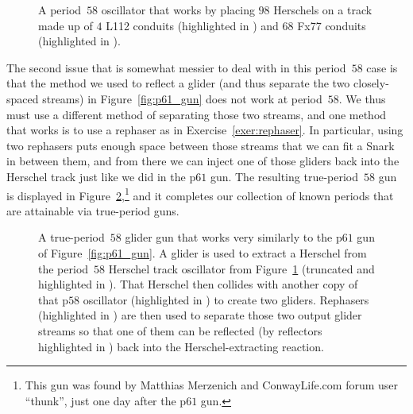 \begin{figure}[!htb]
	\centering
	\caption{A period~$58$ oscillator that works by placing $98$ Herschels on a track made up of $4$ L112 conduits (highlighted in ) and $68$ Fx77 conduits (highlighted in ).}\label{fig:p58_herschel_track}
\end{figure}

The second issue that is somewhat messier to deal with in this period~$58$ case is that the method we used to reflect a glider (and thus separate the two closely-spaced streams) in Figure~\ref{fig:p61_gun} does not work at period~$58$. We thus must use a different method of separating those two streams, and one method that works is to use a rephaser as in Exercise~\ref{exer:rephaser}. In particular, using two rephasers puts enough space between those streams that we can fit a Snark in between them, and from there we can inject one of those gliders back into the Herschel track just like we did in the p$61$ gun. The resulting true-period~$58$ gun is displayed in Figure~\ref{fig:p58_gun},\footnote{This gun was found by Matthias Merzenich and ConwayLife.com forum user ``thunk'', just one day after the p$61$ gun.} and it completes our collection of known periods that are attainable via true-period guns.

\begin{figure}[!htb]
	\centering
	\caption{A true-period~$58$ glider gun that works very similarly to the p$61$ gun of Figure~\ref{fig:p61_gun}. A glider is used to extract a Herschel from the period~$58$ Herschel track oscillator from Figure~\ref{fig:p58_herschel_track} (truncated and highlighted in ). That Herschel then collides with another copy of that p$58$ oscillator (highlighted in ) to create two gliders. Rephasers (highlighted in ) are then used to separate those two output glider streams so that one of them can be reflected (by reflectors highlighted in ) back into the Herschel-extracting reaction.}\label{fig:p58_gun}
\end{figure}




